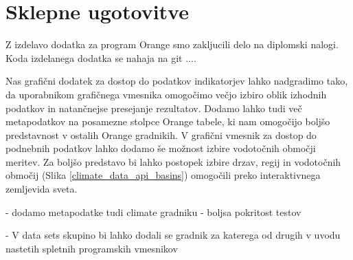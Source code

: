 \chapter{Sklepne ugotovitve}



Z izdelavo dodatka za program Orange smo zakljucili delo na diplomski nalogi.
Koda izdelanega dodatka se nahaja na git ....


% 
%
%
%
%


Nas grafični dodatek za dostop do podatkov indikatorjev lahko nadgradimo tako,
da uporabnikom grafičnega vmesnika omogočimo večjo izbiro oblik izhodnih
podatkov in natančnejse presejanje rezultatov. Dodamo lahko tudi več
metapodatkov na posamezne stolpce Orange tabele, ki nam omogočijo boljšo
predstavnost v ostalih Orange gradnikih. V grafični vmesnik za dostop do
podnebnih podatkov lahko dodamo še možnost izbire vodotočnih območji meritev.
Za boljšo predstavo bi lahko postopek izbire drzav, regij in vodotočnih
območij (Slika \ref{climate_data_api_basins}) omogočili preko interaktivnega zemljevida sveta.


- dodamo metapodatke tudi climate gradniku
- boljsa pokritost testov


- V data sets skupino bi lahko dodali se gradnik za katerega od drugih v uvodu
nastetih spletnih programskih vmesnikov
